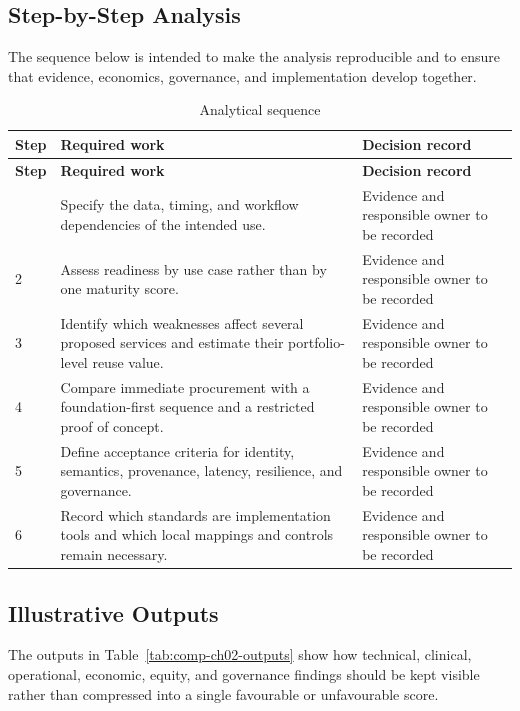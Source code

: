 \subsection{Step-by-Step Analysis}
The sequence below is intended to make the analysis reproducible and to ensure
that evidence, economics, governance, and implementation develop together.

\begin{longtable}{@{}p{}p{}p{}@{}}
\caption{Analytical sequence}
\label{tab:comp-ch02-analysis-steps}\\
\toprule
\textbf{Step} & \textbf{Required work} & \textbf{Decision record} \\
\midrule
\endfirsthead
\toprule
\textbf{Step} & \textbf{Required work} & \textbf{Decision record} \\
\midrule
\endhead
\bottomrule
\endlastfoot
1 & Specify the data, timing, and workflow dependencies of the intended use. & Evidence and responsible owner to be recorded \\
2 & Assess readiness by use case rather than by one maturity score. & Evidence and responsible owner to be recorded \\
3 & Identify which weaknesses affect several proposed services and estimate their portfolio-level reuse value. & Evidence and responsible owner to be recorded \\
4 & Compare immediate procurement with a foundation-first sequence and a restricted proof of concept. & Evidence and responsible owner to be recorded \\
5 & Define acceptance criteria for identity, semantics, provenance, latency, resilience, and governance. & Evidence and responsible owner to be recorded \\
6 & Record which standards are implementation tools and which local mappings and controls remain necessary. & Evidence and responsible owner to be recorded \\
\end{longtable}

\subsection{Illustrative Outputs}
The outputs in Table~\ref{tab:comp-ch02-outputs} show how technical,
clinical, operational, economic, equity, and governance findings should be kept
visible rather than compressed into a single favourable or unfavourable score.

